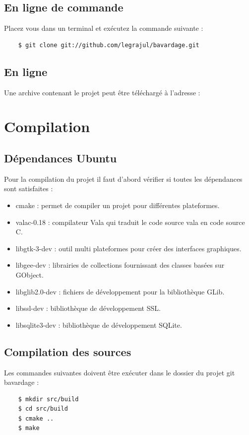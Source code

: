 \documentclass[a4paper,11pt,french]{book}
\begin{document}
 \subsection{En ligne de commande}
 Placez vous dans un terminal et exécutez la commande suivante :
\begin{verbatim} 
    $ git clone git://github.com/legrajul/bavardage.git 
\end{verbatim}

\subsection{En ligne}
 Une archive contenant le projet peut être téléchargé à l'adresse :

\section{Compilation}
\subsection{Dépendances Ubuntu}
Pour la compilation du projet il faut d'abord vérifier si toutes les dépendances sont satisfaites :
\begin{itemize}
\item cmake : permet de compiler un projet pour différentes plateformes.
\item valac-0.18 : compilateur Vala qui traduit le code source vala en code source C.
\item libgtk-3-dev : outil multi plateformes pour créer des interfaces graphiques.
\item libgee-dev : librairies de collections fournissant des classes basées sur GObject.
\item libglib2.0-dev : fichiers de développement pour la bibliothèque GLib.
\item libssl-dev : bibliothèque de développement SSL.
\item libsqlite3-dev : bibliothèque de développement SQLite.

\end{itemize}

\subsection{Compilation des sources}

Les commandes suivantes doivent être exécuter dans le dossier du projet git bavardage : 
\begin{verbatim}
    $ mkdir src/build 
    $ cd src/build 
    $ cmake .. 
    $ make
\end{verbatim}
\end{document}
